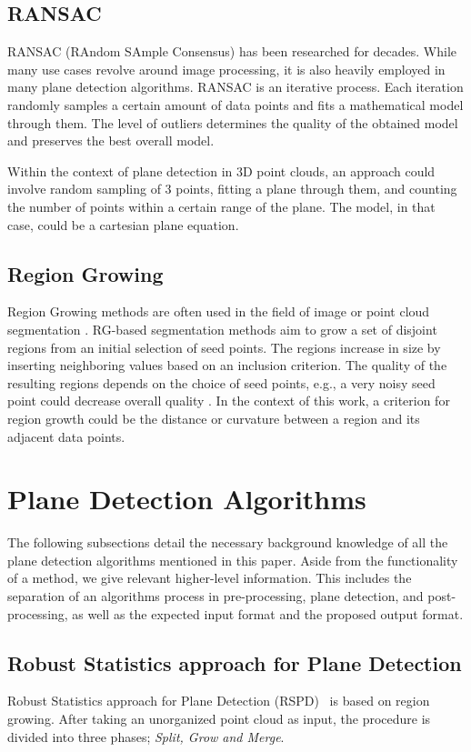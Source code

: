 \documentclass[main.tex]{subfiles}
\begin{document}
\subsection*{RANSAC}
RANSAC (RAndom SAmple Consensus) has been researched for decades. While many use cases revolve around image processing, it is also heavily employed in many plane detection algorithms\cite{Sun_Mordohai_2019, Yang_Forstner, Ashraf_Ahmed_2017}.
RANSAC is an iterative process. Each iteration randomly samples a certain amount of data points and fits a mathematical model through them. The level of outliers determines the quality of the obtained model and preserves the best overall model.

Within the context of plane detection in 3D point clouds, an approach could involve random sampling of 3 points, fitting a plane through them,
and counting the number of points within a certain range of the plane\cite{Yang_Forstner}. The model, in that case, could be a cartesian plane equation.

\subsection*{Region Growing}
Region Growing methods are often used in the field of image or point cloud segmentation \cite{Proença_Gao_2018, Vo_Truong-Hong_Laefer_Bertolotto_2015}.
RG-based segmentation methods aim to grow a set of disjoint regions from an initial selection of seed points. The regions increase in size by inserting neighboring values based on an inclusion criterion.
The quality of the resulting regions depends on the choice of seed points, e.g., a very noisy seed point could decrease overall quality  \cite{Malek_Rahman_Yasiran_Jumaat_Jalil_2012}.
In the context of this work, a criterion for region growth could be the distance or curvature between a region and its adjacent data points.

\section{Plane Detection Algorithms}
The following subsections detail the necessary background knowledge of all the plane detection algorithms mentioned in this paper.
Aside from the functionality of a method, we give relevant higher-level information. This includes the separation of an algorithms
process in pre-processing, plane detection, and post-processing, as well as the expected input format and the proposed output format.


\subsection{Robust Statistics approach for Plane Detection}
\label{subsec:bg-rspd}
Robust Statistics approach for Plane Detection (RSPD)~\cite{Araújo_Oliveira_2020} is based on region growing. After taking an unorganized point cloud as input, the procedure is divided into three phases;
\textit{Split, Grow and Merge}.
\end{document}
